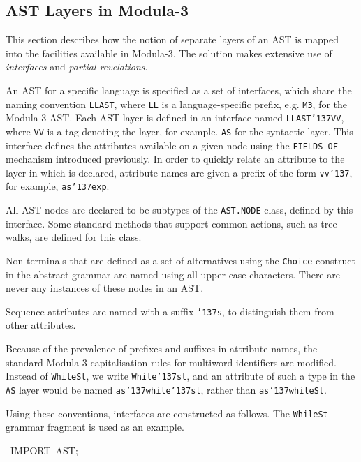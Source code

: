 {{\subsection{AST Layers in Modula-3}
\par
This section describes how the notion of separate layers of an AST
is mapped into the facilities available in Modula-3. The solution
makes extensive use of {\it interfaces} and {\it partial revelations}. 
\par
An AST for a specific language is specified as a set of interfaces,
which share the naming convention {\tt LLAST}, where {\tt LL} is a
language-specific prefix, e.g. {\tt M3}, for the Modula-3 AST. Each AST
layer is defined in an interface named {\tt LLAST\char'137{}VV}, where {\tt VV} is a tag
denoting the layer, for example. {\tt AS} for the syntactic layer. This
interface defines the attributes available on a given node using the
{\tt FIELDS OF} mechanism introduced previously. In order to quickly
relate an attribute to the layer in which is declared, attribute names
are given a prefix of the form {\tt vv\char'137{}}, for example, {\tt as\char'137{}exp}.
\par
All AST nodes are declared to be subtypes of the {\tt AST.NODE} class,
defined by this interface. Some standard methods that support
common actions, such as tree walks, are defined for this class.
\par
Non-terminals that are defined as a set of alternatives using the
{\tt Choice} construct in the abstract grammar are named using all upper
case characters. There are never any instances of these nodes in an
AST.
\par
Sequence attributes are named with a suffix {\tt \char'137{}s}, to distinguish them
from other attributes.
\par
Because of the prevalence of prefixes and suffixes in attribute names,
the standard Modula-3 capitalisation rules for multiword identifiers
are modified. Instead of {\tt WhileSt}, we write {\tt While\char'137{}st}, and an
attribute of such a type in the {\tt AS} layer would be named
{\tt as\char'137{}while\char'137{}st}, rather than {\tt as\char'137{}whileSt}.
\par
Using these conventions, interfaces are constructed as follows. The 
{\tt WhileSt} grammar fragment is used as an example.
\par
\par{}\noindent\par
{\display ~IMPORT~AST;}\noindent\par
}}

